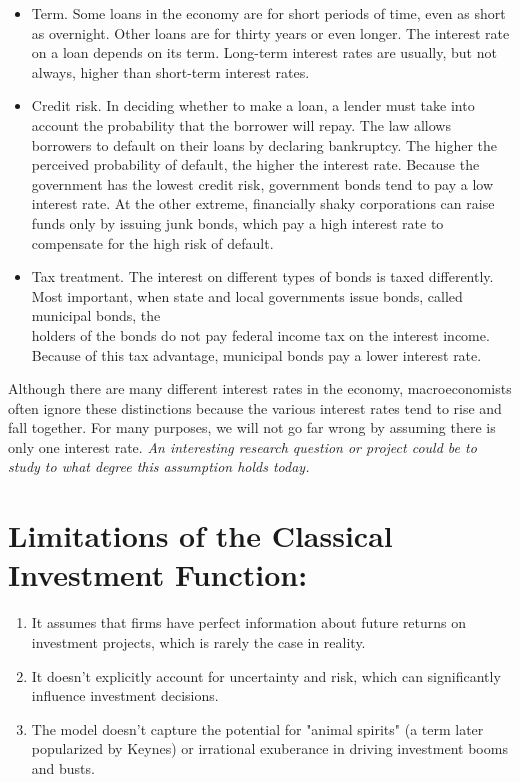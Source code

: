 \documentclass[10pt]{article}
\begin{document}
\begin{itemize}
  \item Term. Some loans in the economy are for short periods of time, even as short as overnight. Other loans are for thirty years or even longer. The interest rate on a loan depends on its term. Long-term interest rates are usually, but not always, higher than short-term interest rates.
  \item Credit risk. In deciding whether to make a loan, a lender must take into account the probability that the borrower will repay. The law allows borrowers to default on their loans by declaring bankruptcy. The higher the perceived probability of default, the higher the interest rate. Because the government has the lowest credit risk, government bonds tend to pay a low interest rate. At the other extreme, financially shaky corporations can raise funds only by issuing junk bonds, which pay a high interest rate to compensate for the high risk of default.
  \item Tax treatment. The interest on different types of bonds is taxed differently. Most important, when state and local governments issue bonds, called municipal bonds, the\\
holders of the bonds do not pay federal income tax on the interest income. Because of this tax advantage, municipal bonds pay a lower interest rate.
\end{itemize}

Although there are many different interest rates in the economy, macroeconomists often ignore these distinctions because the various interest rates tend to rise and fall together. For many purposes, we will not go far wrong by assuming there is only one interest rate. \textit{An interesting research question or project could be to study to what degree this assumption holds today.}

\section*{Limitations of the Classical Investment Function:}
\begin{enumerate}
  \item It assumes that firms have perfect information about future returns on investment projects, which is rarely the case in reality.
  \item It doesn't explicitly account for uncertainty and risk, which can significantly influence investment decisions.
  \item The model doesn't capture the potential for "animal spirits" (a term later popularized by Keynes) or irrational exuberance in driving investment booms and busts.
\end{enumerate}
\end{document}
